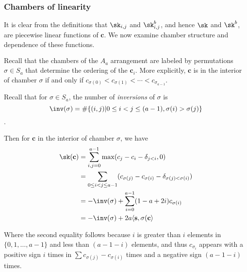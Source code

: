 
\subsubsection{Chambers of linearity} It is clear from the definitions that $\sk_{i,j}$ and $\sk_{i,j}^b$, and hence $\sk$ and $\sk^b$, are piecewise linear functions of $\mathbf{c}$.  We now examine chamber structure and dependence of these functions.


Recall that the chambers of the $A_a$ arrangement are labeled by permutations $\sigma\in S_a$ that determine the ordering of the $\mathbf{c}_i$.  More explicitly, $\mathbf{c}$ is in the interior of chamber $\sigma$ if and only if $c_{\sigma(0)}<c_{\sigma(1)}<\cdots<c_{\sigma_{a-1}}$.

Recall that for $\sigma\in S_a$, the number of \emph{inversions} of $\sigma$ is $$\inv(\sigma)=\#\{(i,j)|0\leq i<j\leq (a-1), \sigma(i)>\sigma(j)\}$$.

Then for $\mathbf{c}$ in the interior of chamber $\sigma$, we have
\begin{align*}
\sk(\mathbf{c})&= \sum_{i,j=0}^{a-1}  \max(c_j-c_i-\delta_{j<i}, 0) \\
 &=\sum_{0\leq i<j\leq a-1} (c_{\sigma(j)}-c_{\sigma(i)}-\delta_{\sigma(j)<\sigma(i)}) \\
                &=-\inv(\sigma)+\sum_{i=0}^{a-1}(1-a+2i)c_{\sigma(i)}\\
&=-\inv(\sigma)+2a\langle\mathbf{s},\sigma(\mathbf{c}\rangle
\end{align*}

Where the second equality follows because $i$ is greater than $i$ elements in $\{0,1,\dots,a-1\}$ and less than $(a-1-i)$ elements, and thus $c_{\sigma_i}$ appears with a positive sign $i$ times in $\sum c_{\sigma(j)}-c_{\sigma(i)}$ times and a negative sign $(a-1-i)$ times.



